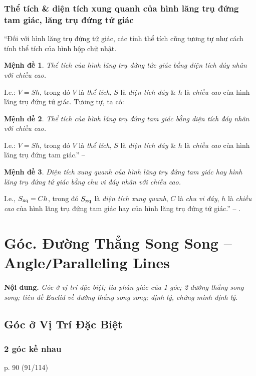 \documentclass{article}
\numberwithin{equation}{section}
\newtheorem{menhde}{Mệnh đề}[section]
\begin{document}
\subsubsection{Thể tích \& diện tích xung quanh của hình lăng trụ đứng tam giác, lăng trụ đứng tứ giác}
``Đối với hình lăng trụ đứng tứ giác, các tính thể tích cũng tương tự như cách tính thể tích của hình hộp chữ nhật.

\begin{menhde}
	Thể tích của hình lăng trụ đứng tức giác bằng diện tích đáy nhân với chiều cao.
\end{menhde}
I.e.: $V = Sh$, trong đó $V$ là \textit{thể tích}, $S$ là \textit{diện tích đáy} \& $h$ là \textit{chiều cao} của hình lăng trụ đứng tứ giác. Tương tự, ta có:

\begin{menhde}
	Thể tích của hình lăng trụ đứng tam giác bằng diện tích đáy nhân với chiều cao.
\end{menhde}
I.e.: $V = Sh$, trong đó $V$ là \textit{thể tích}, $S$ là \textit{diện tích đáy} \& $h$ là \textit{chiều cao} của hình lăng trụ đứng tam giác.'' -- \cite[p. 84]{SGK_Toan_7_Canh_Dieu_tap_1}

\begin{menhde}
	Diện tích xung quanh của hình lăng trụ đứng tam giác hay hình lăng trụ đứng tứ giác bằng chu vi đáy nhân với chiều cao.
\end{menhde}
I.e., $S_{\rm xq} = Ch$, trong đó $S_{\rm xq}$ là \textit{diện tích xung quanh}, $C$ là \textit{chu vi đáy}, $h$ là \textit{chiều cao} của hình lăng trụ đứng tam giác hay của hình lăng trụ đứng tứ giác.'' -- \cite[p. 85]{SGK_Toan_7_Canh_Dieu_tap_1}.


\section{Góc. Đường Thẳng Song Song -- Angle\texttt{/}Paralleling Lines}
\textbf{Nội dung.} \textit{Góc ở vị trí đặc biệt; tia phân giác của 1 góc; 2 đường thẳng song song; tiên đề Euclid về đường thẳng song song; định lý, chứng minh định lý}.

\subsection{Góc ở Vị Trí Đặc Biệt}

\subsubsection{2 góc kề nhau}
p. 90 (91/114)
\end{document}
